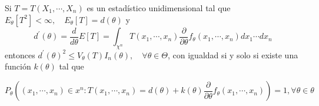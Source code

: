 \begin{teorema}
  Si $T=T\left(X_{1}, \cdots, X_{n}\right)$ es un estadístico unidimensional tal que $E_{\theta}\left[T^{2}\right]<\infty, \quad E_{\theta}[T]=d(\theta)$ y $$d^{\prime}(\theta) = \frac{d}{d\theta} E[T] =\int_{\chi^{n}} T\left(x_{1}, \cdots, x_{n}\right) \frac{\partial}{\partial \theta} f_{\theta}\left(x_{1}, \cdots, x_{n}\right) d x_{1} \cdots d x_{n}$$ entonces $d^{\prime}(\theta)^{2} \leq V_{\theta}(T) I_{n}(\theta), \quad \forall \theta \in \Theta$, con igualdad si y solo si existe una función $k(\theta)$ tal que

  $$
    P_{\theta}\left(\left(x_{1}, \cdots, x_{n}\right) \in x^{n}: T\left(x_{1}, \cdots, x_{n}\right)=d(\theta)+k(\theta) \frac{\partial}{\partial \theta} f_{\theta}\left(x_{1}, \cdots, x_{n}\right)\right)=1, \forall \theta \in \theta
  $$
\end{teorema}


